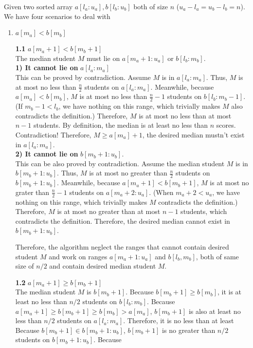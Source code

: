 \documentclass{article}
\begin{document}
Given two sorted array $a[l_a: u_a], b[l_b:u_b]$ both of size $n$ ($u_a-l_a = u_b-l_b=n$). We have four scenarios to deal with \begin{enumerate}
    \item $a[m_a] < b[m_b]$ 
     
            \textbf{1.1} \textbf{$a[m_a+1]<b[m_b+1]$}\\
            The median student $M$ must lie on $a[m_a+1:u_a]$ or $b[l_b:m_b]$.
            \\\textbf{1) It cannot lie on }$a[l_a:m_a]$\\
             This can be proved by contradiction. Assume $M$ is in $a[l_a:m_a]$. Thus, $M$ is at most no less than $\frac{n}{2}$ students on $a[l_a:m_a]$. Meanwhile, because $a[m_a]<b[m_b]$, $M$ is at most no less than $\frac{n}{2}-1$ students on $b[l_b:m_b-1]$. (If $m_b-1 < l_b$, we have nothing on this range, which trivially makes $M$ also contradicts the definition.) Therefore, $M$ is at most no less than at most $n-1$ students. By definition, the median is at least no less than $n$ scores. Contradiction! Therefore, $M \geq a[m_a]+1$, the desired median mustn't exist in $a[l_a:m_a]$.
            \\\textbf{2) It cannot lie on} $b[m_b+1: u_b]$.\\
            This can be also proved by contradiction. Assume the median student $M$ is in $b[m_b+1: u_b]$. Thus, $M$  is at most no greater than $\frac{n}{2}$ students on $b[m_b+1: u_b]$. Meanwhile, because $a[m_a+1] < b[m_b+1]$, $M$ is at most no grater than $\frac{n}{2}-1$ students on $a[m_a+2:u_a]$. (When $m_a+2 < u_a$, we have nothing on this range, which trivially makes $M$ contradicts the definition.) Therefore, $M$ is at most no greater than at most $n-1$ students, which contradicts the definition. Therefore, the desired median cannot exist in $b[m_b+1:u_b]$.
        
        Therefore, the algorithm neglect the ranges that cannot contain desired student $M$ and work on ranges $a[m_a+1:u_a]$ and $b[l_b,m_b]$, both of same size of $n/2$ and contain desired median student $M$.

            \textbf{1.2} $a[m_a+1]\geq b[m_b+1]$\\
            The median student $M$ is $b[m_b+1]$. Because $b[m_b+1] \geq b[m_b]$, it is at least no less than $n/2$ students on $b[l_b:m_b]$. Because $a[m_a+1]\geq b[m_b+1] \geq b[m_b] > a[m_a]$, $b[m_b+1]$ is also at least no less than $n/2$ students on $a[l_a:m_a]$. Therefore, it is no less than at least Because $b[m_b+1] \in b[m_b+1:u_b]$, $b[m_b+1]$ is no greater than $n/2$ students on $b[m_b+1:u_b]$. Because 
    
    
\end{enumerate}
\end{document}
